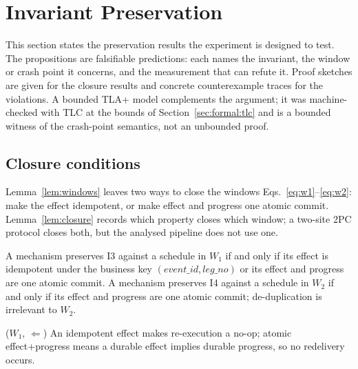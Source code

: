 
\section{Invariant Preservation}
\label{sec:formal}

This section states the preservation results the experiment is designed to test. The
propositions are falsifiable predictions: each names the invariant, the window or crash point
it concerns, and the measurement that can refute it. Proof sketches are given for the closure
results and concrete counterexample traces for the violations. A bounded TLA+
\cite{lamport1994} model complements the argument; it was machine-checked with TLC at the
bounds of Section~\ref{sec:formal:tlc} and is a bounded witness of the crash-point semantics,
not an unbounded proof.

\subsection{Closure conditions}
\label{sec:formal:closure}

Lemma~\ref{lem:windows} leaves two ways to close the windows
Eqs.~\eqref{eq:w1}--\eqref{eq:w2}: make the effect idempotent, or make effect and progress one
atomic commit. Lemma~\ref{lem:closure} records which property closes which window; a two-site
2PC protocol closes both, but the analysed pipeline does not use one.

\begin{lemma}[Closure]
\label{lem:closure}
A mechanism preserves I3 against a schedule in $W_1$ if and only if its effect is idempotent
under the business key $(\mathit{event\_id},\mathit{leg\_no})$ or its effect and progress are
one atomic commit. A mechanism preserves I4 against a schedule in $W_2$ if and only if its
effect and progress are one atomic commit; de-duplication is irrelevant to $W_2$.
\end{lemma}

\begin{proofsketch}
($W_1$, $\Leftarrow$) An idempotent effect makes re-execution a no-op; atomic
effect+progress means a durable effect implies durable progress, so no redelivery occurs.
\end{proofsketch}


